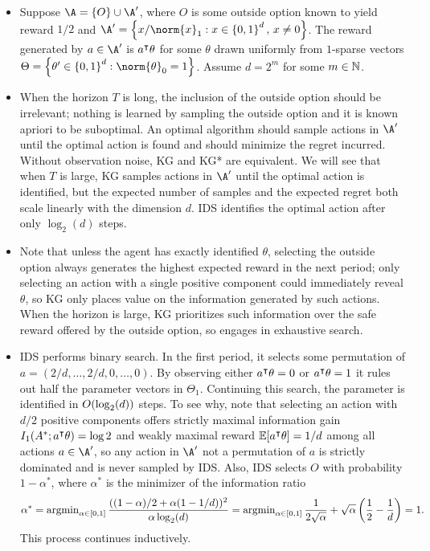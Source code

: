 \documentclass[11pt, openany]{book}
\begin{document}
\begin{example}
    \begin{itemize}
        \item Suppose $\A=\set{O}\cup\A'$, where $O$ is some outside option known to yield reward $1/2$ and $\A'=\set{x/\norm{x}_1 : x\in\set{0,1}^d,\, x\neq 0}$. The reward generated by $a\in\A'$ is $a^\intercal\theta$ for some $\theta$ drawn uniformly from $1$-sparse vectors $\Theta=\set{\theta'\in\set{0,1}^d : \norm{\theta}_0 = 1}$. Assume $d=2^m$ for some $m\in\mathbb{N}$.
        \item When the horizon $T$ is long, the inclusion of the outside option should be irrelevant; nothing is learned by sampling the outside option and it is known apriori to be suboptimal. An optimal algorithm should sample actions in $\A'$ until the optimal action is found and should minimize the regret incurred. Without observation noise, KG and KG* are equivalent. We will see that when $T$ is large, KG samples actions in $\A'$ until the optimal action is identified, but the expected number of samples and the expected regret both scale linearly with the dimension $d$. IDS identifies the optimal action after only $\log_2(d)$ steps.
        \item Note that unless the agent has exactly identified $\theta$, selecting the outside option always generates the highest expected reward in the next period; only selecting an action with a single positive component could immediately reveal $\theta$, so KG only places value on the information generated by such actions. When the horizon is large, KG prioritizes such information over the safe reward offered by the outside option, so engages in exhaustive search.
        \item IDS performs binary search. In the first period, it selects some permutation of $a=(2/d,\dots,2/d,0,\dots,0)$. By observing either $a^\intercal\theta=0$ or $a^\intercal\theta=1$ it rules out half the parameter vectors in $\Theta_1$. Continuing this search, the parameter is identified in $O(\log_2(d))$ steps. To see why, note that selecting an action with $d/2$ positive components offers strictly maximal information gain $I_1(A^*;a^\intercal\theta)=\log 2$ and weakly maximal reward $\mathbb{E}[a^\intercal\theta]=1/d$ among all actions $a\in\A'$, so any action in $\A'$ not a permutation of $a$ is strictly dominated and is never sampled by IDS. Also, IDS selects $O$ with probability $1-\alpha^*$, where $\alpha^*$ is the minimizer of the information ratio
            \[
                \alpha^* = \operatorname{argmin}_{\alpha\in[0,1]} \frac{ ((1-\alpha)/2 + \alpha(1-1/d))^2}{\alpha\log_2(d)} = \operatorname{argmin}_{\alpha\in [0,1]} \frac{1}{2\sqrt{\alpha}} + \sqrt{\alpha}\left(\frac{1}{2}-\frac{1}{d}\right) = 1.
            \]
            This process continues inductively.
    \end{itemize}
\end{example}
\end{document}
